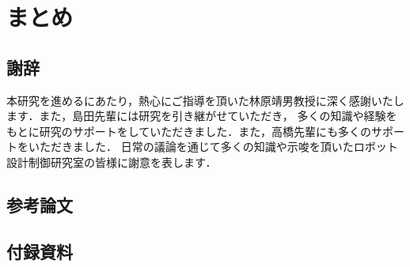 \documentclass[../main]{subfiles}
\begin{document}
\setcounter{secnumdepth}{2}
    \chapter{まとめ}
        \section*{謝辞}
        本研究を進めるにあたり，熱心にご指導を頂いた林原靖男教授に深く感謝いたします．また，島田先輩には研究を引き継がせていただき，
        多くの知識や経験をもとに研究のサポートをしていただきました．また，高橋先輩にも多くのサポートをいただきました．
        日常の議論を通じて多くの知識や示唆を頂いたロボット設計制御研究室の皆様に謝意を表します．
        \section*{参考論文}
        \section*{付録資料}
\end{document}
